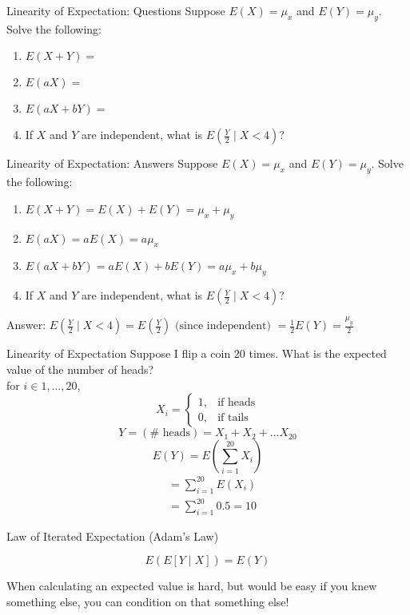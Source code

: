 \documentclass{beamer}
\begin{document}
\begin{frame}{Linearity of Expectation: Questions}
Suppose $E(X)=\mu_x$ and $E(Y)=\mu_y$. Solve the following:
\begin{enumerate}
\item $E(X+Y) = $
\item $E(aX) = $
\item $E(aX+bY) = $
\item If $X$ and $Y$ are independent, what is $E\left(\frac{Y}{2}\mid X<4\right)$?
\end{enumerate}
\end{frame}

\begin{frame}{Linearity of Expectation: Answers}
Suppose $E(X)=\mu_x$ and $E(Y)=\mu_y$. Solve the following:
\begin{enumerate}
\item $E(X+Y) = E(X) + E(Y) = \mu_x+\mu_y$
\item $E(aX) = aE(X) = a\mu_x$
\item $E(aX+bY) = aE(X)+bE(Y) = a\mu_x + b\mu_y$
\item If $X$ and $Y$ are independent, what is $E\left(\frac{Y}{2}\mid X<4\right)$?
\end{enumerate}
Answer: $E(\frac{Y}{2}\mid X<4)=E\left(\frac{Y}{2}\right)\text{ (since independent) }=\frac{1}{2}E(Y)=\frac{\mu_y}{2}$
\end{frame}

\begin{frame}{Linearity of Expectation}
Suppose I flip a coin 20 times. What is the expected value of the number of heads? \\
\pause
for $i\in 1,\dots,20$,
$$X_i=\begin{cases}1,& \text{if heads} \\
0,& \text{if tails} \end{cases}$$
$$Y = (\#\text{ heads}) = X_1+X_2+...X_{20}$$
\pause
$$E(Y) = E\left (\sum_{i=1}^{20} X_i\right )$$
\pause
\begin{align*}
&=\sum_{i=1}^{20} E(X_i) \\
&=\sum_{i=1}^{20} 0.5 = 10
\end{align*}
\end{frame}

\begin{frame}{Law of Iterated Expectation (Adam's Law)}
\begin{theorem}
$$E(E[Y\mid X])=E(Y)$$
\end{theorem}
When calculating an expected value is hard, but would be easy if you knew something else, \alert{you can condition on that something else!}
\end{frame}
\end{document}
